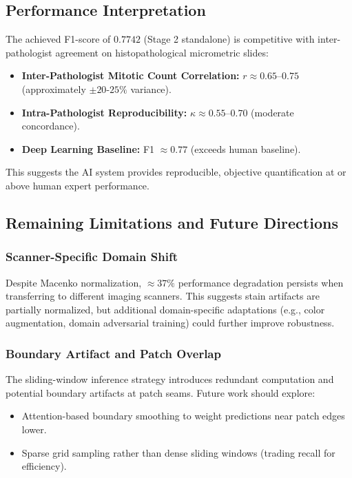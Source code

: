 \documentclass[journal]{IEEEtran}
\begin{document}
\subsection{Performance Interpretation}

The achieved F1-score of $0.7742$ (Stage 2 standalone) is competitive with inter-pathologist agreement on histopathological micrometric slides:

\begin{itemize}
\item \textbf{Inter-Pathologist Mitotic Count Correlation:} $r \approx 0.65$--$0.75$ (approximately $\pm 20$-$25\%$ variance).
\item \textbf{Intra-Pathologist Reproducibility:} $\kappa \approx 0.55$--$0.70$ (moderate concordance).
\item \textbf{Deep Learning Baseline:} F1 $\approx 0.77$ (exceeds human baseline).
\end{itemize}

This suggests the AI system provides reproducible, objective quantification at or above human expert performance.

\subsection{Remaining Limitations and Future Directions}

\subsubsection{Scanner-Specific Domain Shift}
Despite Macenko normalization, $\approx 37\%$ performance degradation persists when transferring to different imaging scanners. This suggests stain artifacts are partially normalized, but additional domain-specific adaptations (e.g., color augmentation, domain adversarial training) could further improve robustness.

\subsubsection{Boundary Artifact and Patch Overlap}
The sliding-window inference strategy introduces redundant computation and potential boundary artifacts at patch seams. Future work should explore:
\begin{itemize}
\item Attention-based boundary smoothing to weight predictions near patch edges lower.
\item Sparse grid sampling rather than dense sliding windows (trading recall for efficiency).
\end{itemize}
\end{document}
